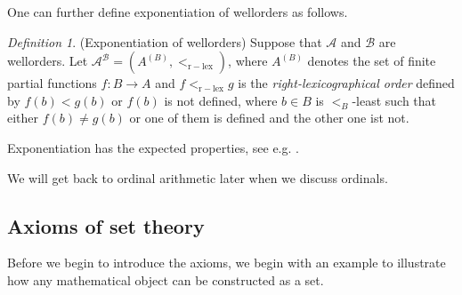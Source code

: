 \documentclass[a4paper, 11pt]{amsart}
\theoremstyle{remark}
\newtheorem{definition}[definition]{Definition}
\newcommand{\NN}{\mathbb{N}}
\newcommand{\cB}{\mathcal B}
\newcommand{\cA}{\mathcal A}
\begin{document}
One can further define exponentiation of wellorders as follows. 

\begin{definition}(Exponentiation of wellorders) 
Suppose that $\cA$ and $\cB$ are wellorders. 
Let $\cA^{\cB}= (A ^{(B)}, <_{\mathrm{r-lex}})$, where $A ^{(B)}$ denotes the set of finite partial functions $f\colon B\rightarrow A$ and 
$f<_{\mathrm{r-lex}} g$ is the \emph{right-lexicographical order} defined by $f(b)<g(b)$ or $f(b)$ is not defined, where $b\in B$ is $<_B$-least such that either $f(b)\neq g(b)$ or one of them is defined and the other one ist not. 
\end{definition} 

Exponentiation has the expected properties, see e.g. \cite[Exercises 3.10 \& 3.11]{schimmerling2011course}. 

We will get back to ordinal arithmetic later when we discuss ordinals. 










\subsection{Axioms of set theory} 


Before we begin to introduce the axioms, we begin with an example to illustrate how any mathematical object can be constructed as a set. 
\end{document}
